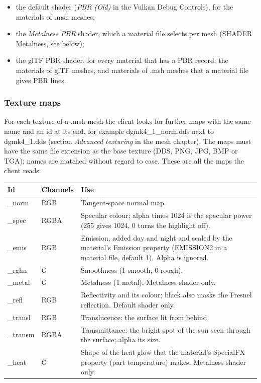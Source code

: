 \documentclass[Orbiter Developer Manual.tex]{subfiles}
\begin{document}
\begin{sloppypar}
\begin{itemize}
\item the default shader (\textit{PBR (Old)} in the Vulkan Debug Controls), for the materials of .msh meshes;
\item the \textit{Metalness PBR} shader, which a material file selects per mesh (SHADER Metalness, see below);
\item the glTF PBR shader, for every material that has a PBR record: the materials of glTF meshes, and materials of .msh meshes that a material file gives PBR lines.
\end{itemize}


\subsubsection{Texture maps}
\label{sssec:vk_texmaps}
For each texture of a .msh mesh the client looks for further maps with the same name and an id at its end, for example dgmk4\_1\_norm.dds next to dgmk4\_1.dds (section \textit{Advanced texturing} in the mesh chapter). The maps must have the same file extension as the base texture (DDS, PNG, JPG, BMP or TGA); names are matched without regard to case. These are all the maps the client reads:

	\begin{longtable}{ |p{}|p{}|p{}| }
	\hline\rule{0pt}{2ex}
	\textbf{Id} & \textbf{Channels} & \textbf{Use}\\
	\hline\rule{0pt}{2ex}
	\_norm & RGB & Tangent-space normal map.\\
	\hline\rule{0pt}{2ex}
	\_spec & RGBA & Specular colour; alpha times 1024 is the specular power (255 gives 1024, 0 turns the highlight off).\\
	\hline\rule{0pt}{2ex}
	\_emis & RGB & Emission, added day and night and scaled by the material's Emission property (EMISSION2 in a material file, default 1). Alpha is ignored.\\
	\hline\rule{0pt}{2ex}
	\_rghn & G & Smoothness (1 smooth, 0 rough).\\
	\hline\rule{0pt}{2ex}
	\_metal & G & Metalness (1 metal). Metalness shader only.\\
	\hline\rule{0pt}{2ex}
	\_refl & RGB & Reflectivity and its colour; black also masks the Fresnel reflection. Default shader only.\\
	\hline\rule{0pt}{2ex}
	\_transl & RGB & Translucence: the surface lit from behind.\\
	\hline\rule{0pt}{2ex}
	\_transm & RGBA & Transmittance: the bright spot of the sun seen through the surface; alpha its size.\\
	\hline\rule{0pt}{2ex}
	\_heat & G & Shape of the heat glow that the material's SpecialFX property (part temperature) makes. Metalness shader only.\\
	\hline
	\end{longtable}


\end{sloppypar}
\end{document}
